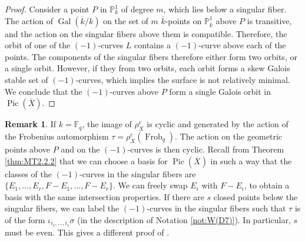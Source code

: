 \documentclass[a4paper, 11pt, reqno]{amsart}
\numberwithin{equation}{section} \numberwithin{figure}{section}
\DeclareMathOperator{\Pic}{Pic}
\DeclareMathOperator{\Gal}{Gal}
\DeclareMathOperator{\Frob}{Frob}
\def \F {{\mathbb F}}
\def \P {{\mathbb P}}
\theoremstyle{definition}
\newtheorem{remark}[lemma]{Remark}
\numberwithin{lemma}{section}
\begin{document}
\begin{proof}
   Consider a point $P$ in $\P^1_{k}$ of degree $m$, which lies below a singular fiber. The action of $\Gal(\overline{k}/k)$ on the set of $m$ $\overline{k}$-points on $\P^1_{\overline{k}}$ above $P$ is transitive, and the action on the singular fibers above them is compatible. Therefore, the orbit of one of the $(-1)$-curves $L$ contains a $(-1)$-curve above each of the points. The components of the singular fibers therefore either form two orbits, or a single orbit. However, if they from two orbits, each orbit forms a skew Galois stable set of $(-1)$-curves, which implies the surface is not relatively minimal. We conclude that the $(-1)$-curves above $P$ form a single Galois orbit in $\Pic(\overline{X})$. 
\end{proof}

\begin{remark}\label{rem:orbitsinsingularfibersFq}
    If $k = \F_q$, the image of $\rho_X^c$ is cyclic and generated by the action of the Frobenius automorphism $\tau = \rho_X^c(\Frob_q)$. The action on the geometric points above $P$ and on the $(-1)$-curves is then cyclic. Recall from Theorem \ref{thm:MT2.2.2} that we can choose a basis for $\Pic(\overline{X})$ in such a way that the classes of the $(-1)$-curves in the singular fibers are $\{E_1, \ldots, E_r, F-E_1, \ldots, F - E_r\}$. We can freely swap $E_i$ with $F-E_i$, to obtain a basis with the same intersection properties. If there are $s$ closed points below the singular fibers, we can label the $(-1)$-curves in the singular fibers such that $\tau$ is of the form $\iota_{i_1, \ldots, i_s}\sigma$ (in the description of Notation \ref{not:W(D7)}). In particular, $s$ must be even. This gives a different proof of \cite[Corollary 2.10]{rybakov}.
\end{remark}
\end{document}
